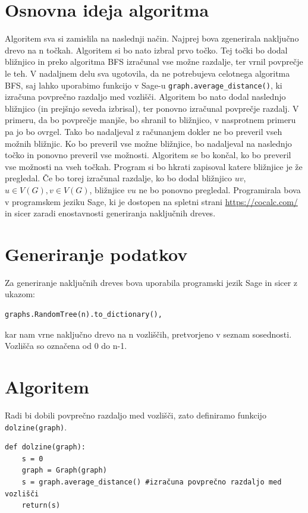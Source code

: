 \documentclass[a4paper,10pt]{article}
\begin{document}
\section{Osnovna ideja algoritma}
Algoritem sva si zamislila na naslednji način. Najprej bova zgenerirala naključno drevo na n točkah. Algoritem si bo nato izbral prvo točko. Tej točki bo dodal bližnjico in preko algoritma BFS izračunal vse možne razdalje, ter vrnil povprečje le teh. V nadaljnem delu sva ugotovila, da ne potrebujeva celotnega algoritma BFS, saj lahko uporabimo funkcijo v Sage-u \texttt{graph.average\_distance()}, ki izračuna povprečno razdaljo med vozlišči. Algoritem bo nato dodal naslednjo bližnjico (in prejšnjo seveda izbrisal), ter ponovno izračunal povprečje razdalj. V primeru, da bo povprečje manjše, bo shranil to bližnjico, v nasprotnem primeru pa jo bo ovrgel. Tako bo nadaljeval z računanjem dokler ne bo preveril vseh možnih bližnjic. Ko bo preveril vse možne bližnjice, bo nadaljeval na naslednjo točko in ponovno preveril vse možnosti. Algoritem se bo končal, ko bo preveril vse možnosti na vseh točkah. 
\newline
Program si bo hkrati zapisoval katere bližnjice je že pregledal. Če bo torej izračunal razdalje, ko bo dodal bližnjico $uv$,$u \in V(G),v\in V(G)$, bližnjice $vu$ ne bo ponovno pregledal.
\newline
Programirala bova v programskem jeziku Sage, ki je dostopen na spletni strani 
\url{https://cocalc.com/}
 in sicer zaradi enostavnosti generiranja naključnih dreves.

\section{Generiranje podatkov}
Za generiranje naključnih dreves bova uporabila programski jezik Sage in sicer z ukazom:
\begin{verbatim}
graphs.RandomTree(n).to_dictionary(),
\end{verbatim}
kar nam vrne naključno drevo na n vozliščih, pretvorjeno v seznam sosednosti. Vozlišča so označena od 0 do n-1.

\section{Algoritem}
%
%
Radi bi dobili povprečno razdaljo med vozlišči, zato definiramo funkcijo \texttt{dolzine(graph)}.
\begin{verbatim}
def dolzine(graph):
    s = 0
    graph = Graph(graph)
    s = graph.average_distance() #izračuna povprečno razdaljo med vozlišči
    return(s)
\end{verbatim}
\end{document}
